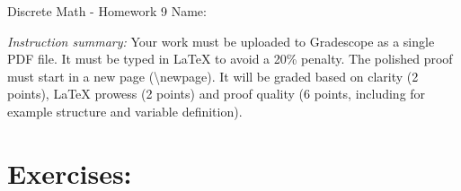 \documentclass[12pt]{article}
\begin{document}
\begin{center}
    {\LARGE Discrete Math - Homework 9}  \Large \newline
    Name:
\end{center}

\emph{Instruction summary:} Your work must be uploaded to Gradescope as a single PDF file. It must be typed in LaTeX to avoid a 20\% penalty. The polished proof must start in a new page (\textbackslash newpage). It will be graded based on clarity (2 points), LaTeX prowess (2 points) and proof quality (6 points, including for example structure and variable definition).

\section*{Exercises:}
\end{document}
